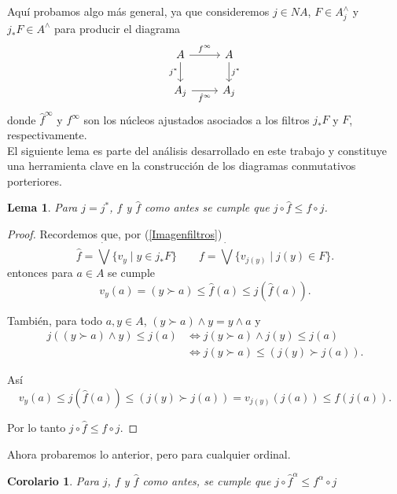 \documentclass[12pt]{article}
\newtheorem{lem}[thm]{Lema}
\newtheorem{cor}[thm]{Corolario}
\begin{document}
Aquí probamos algo más general, ya que consideremos $j\in NA$, $F\in A_j^\wedge$ y $j_*F\in A^\wedge$ para producir el diagrama
\[\begin{tikzcd}
	A & A \\
	{A_j} & {A_j}
	\arrow["{f^\infty}", from=1-1, to=1-2]
	\arrow["j^*"', from=1-1, to=2-1]
	\arrow["j^*", from=1-2, to=2-2]
	\arrow["{\hat{f}^\infty}"', from=2-1, to=2-2]
\end{tikzcd}\]
donde $\hat{f}^\infty$ y $f^\infty$ son los núcleos ajustados asociados a los filtros $j_*F$ y $F$, respectivamente.\\

El siguiente lema es parte del análisis desarrollado en este trabajo y constituye una herramienta clave en la construcción de los diagramas conmutativos
porteriores.

\begin{lem}\label{f1f}
    Para $j=j^*$, $f$ y $\hat{f}$ como antes se cumple que $j\circ \hat{f}\leq f\circ j$.
\end{lem}
\begin{proof}
    Recordemos que, por (\ref{Imagenfiltros})
    \[
    \hat{f}=\dot{\bigvee}\{v_y\mid y\in j_*F\} \qquad f=\dot{\bigvee}\{v_{j(y)}\mid j(y)\in F\}. 
    \]
entonces para $a\in A$ se cumple
\[
v_y(a)=(y\succ a)\leq \hat{f}(a)\leq j(\hat{f}(a)).
\]

También, para todo $a, y\in A$, $(y\succ a)\wedge y=y\wedge a$ y
\[
\begin{split}
j((y\succ a)\wedge y)\leq j(a) & \Leftrightarrow j(y\succ a)\wedge j(y)\leq j(a)\\
& \Leftrightarrow j(y\succ a)\leq (j(y)\succ j(a)).
\end{split}
\]

Así 
\[
v_y(a)\leq j(\hat{f}(a))\leq (j(y)\succ j(a))=v_{j(y)}(j(a))\leq f(j(a)).
\]

Por lo tanto $j\circ \hat{f}\leq f\circ j$.
\end{proof}

Ahora probaremos lo anterior, pero para cualquier ordinal.

\begin{cor}\label{finftyf}
    Para $j$, $f$ y $\hat{f}$ como antes, se cumple que $j\circ \hat{f}^\alpha\leq f^\alpha\circ j$
\end{cor}
\end{document}
